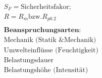 \begin{minipage}{0.58\linewidth}
    \begin{center}
        \begin{footnotesize}  
        \end{footnotesize}
    \end{center}
\end{minipage}
\begin{minipage}{0.4\linewidth}
    \begin{center}
        \begin{scriptsize}
            \begin{align*}
                &S_F = \text{Sicherheitsfakor;}
                \\ &R = R_m \text{bzw.} R_{p0.2}
                \\~\\ &\textbf{Beanspruchungsarten:}
                \\ &\text{Mechanik (Statik \& Mechanik)}
                \\ &\text{Umwelteinflüsse (Feuchtigkeit)}
                \\ &\text{Belastungsdauer}
                \\ &\text{Belastungshöhe (Intensität)}
            \end{align*}
        \end{scriptsize}
    \end{center}
\end{minipage}
